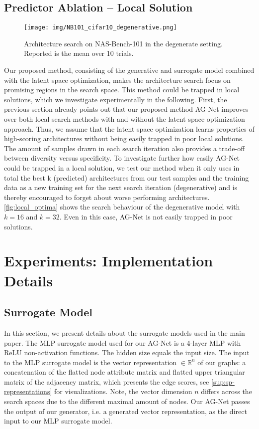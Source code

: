 \documentclass[runningheads]{llncs}
\begin{document}
\subsection{Predictor Ablation -- Local Solution}
\begin{figure}
	\centering
	\texttt{[image: img/NB101\_cifar10\_degenerative.png]}
	\caption{Architecture search on NAS-Bench-101 in the degenerate setting. Reported is the mean over 10 trials.
		\label{fig:local_optima}}
\end{figure}
Our proposed method, consisting of the generative and surrogate model combined with the latent space optimization, makes the architecture search focus on promising regions in the search space. This method could be trapped in local solutions, which we investigate experimentally in the following. First, the previous section already points out that our proposed method AG-Net improves over both local search methods with and without the latent space optimization approach. Thus, we assume that the latent space optimization learns properties of high-scoring architectures without being easily trapped in poor local solutions. The amount of samples drawn in each search iteration also provides a trade-off between diversity versus specificity. To investigate further how easily AG-Net could be trapped in a local solution, we test our method when it only uses in total the best k (predicted) architectures from our test samples and the training data as a new training set for the next search iteration (degenerative) and is thereby encouraged to forget about worse performing architectures. \autoref{fig:local_optima} shows the search behaviour of the degenerative model with $k=16$ and $k=32$. Even in this case, AG-Net is not easily trapped in poor solutions.



\section{Experiments: Implementation Details}
\label{sup:implementation-details}

\subsection{Surrogate Model}
In this section, we present details about the surrogate models used in the main paper.
The MLP surrogate model used for our AG-Net is a 4-layer MLP with ReLU non-activation functions.
The hidden size equals the input size.
The input to the MLP surrogate model is the vector representation $\in \mathbb{R}^n$ of our graphs: a concatenation of the flatted node attribute matrix and flatted upper triangular matrix of the adjacency matrix, which presents the edge scores, see \autoref{sup:sp-representations} for visualizations.
Note, the vector dimension $n$ differs across the search spaces due to the different maximal amount of nodes.
Our AG-Net passes the output of our generator, i.e. a generated vector representation, as the direct input to our MLP surrogate model.
\end{document}
